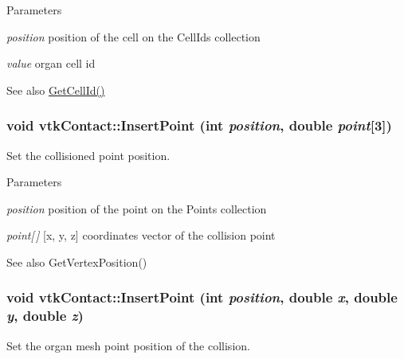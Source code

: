 \begin{DoxyParams}{Parameters}
\item[{\em position}]position of the cell on the CellIds collection \item[{\em value}]organ cell id \end{DoxyParams}
\begin{DoxySeeAlso}{See also}
\hyperlink{classvtkContact_a825566e780e4fca5dc766b3c7c259366}{GetCellId()} 
\end{DoxySeeAlso}
\hypertarget{classvtkContact_a7efd643d147764c928443a0950804b38}{
\subsubsection[{InsertPoint}]{\setlength{\rightskip}{0pt plus 5cm}void vtkContact::InsertPoint (int {\em position}, \/  double {\em point}\mbox{[}3\mbox{]})}}
\label{classvtkContact_a7efd643d147764c928443a0950804b38}


Set the collisioned point position. 


\begin{DoxyParams}{Parameters}
\item[{\em position}]position of the point on the Points collection \item[{\em point\mbox{[}$\,$\mbox{]}}]\mbox{[}x, y, z\mbox{]} coordinates vector of the collision point \end{DoxyParams}
\begin{DoxySeeAlso}{See also}
GetVertexPosition() 
\end{DoxySeeAlso}
\hypertarget{classvtkContact_a16a56cca72694b4dc56872321e6f31e8}{
\subsubsection[{InsertPoint}]{\setlength{\rightskip}{0pt plus 5cm}void vtkContact::InsertPoint (int {\em position}, \/  double {\em x}, \/  double {\em y}, \/  double {\em z})}}
\label{classvtkContact_a16a56cca72694b4dc56872321e6f31e8}


Set the organ mesh point position of the collision. 


